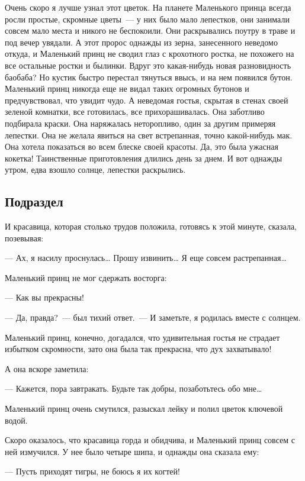 \documentclass[14pt, a4paper, titlepage]{extarticle}
\begin{document}
Очень скоро я лучше узнал этот цветок. На планете Маленького принца всегда росли простые, скромные цветы~--- у них было мало лепестков, они занимали совсем мало места и никого не беспокоили. Они раскрывались поутру в траве и под вечер увядали. А этот пророс однажды из зерна, занесенного неведомо откуда, и Маленький принц не сводил глаз с крохотного ростка, не похожего на все остальные ростки и былинки. Вдруг это какая-нибудь новая разновидность баобаба? Но кустик быстро перестал тянуться ввысь, и на нем появился бутон. Маленький принц никогда еще не видал таких огромных бутонов и предчувствовал, что увидит чудо. А неведомая гостья, скрытая в стенах своей зеленой комнатки, все готовилась, все прихорашивалась. Она заботливо подбирала краски. Она наряжалась неторопливо, один за другим примеряя лепестки. Она не желала явиться на свет встрепанная, точно какой-нибудь мак. Она хотела показаться во всем блеске своей красоты. Да, это была ужасная кокетка! Таинственные приготовления длились день за днем. И вот однажды утром, едва взошло солнце, лепестки раскрылись.\cite{bib:prince}

\subsection{Подраздел}

И красавица, которая столько трудов положила, готовясь к этой минуте, сказала, позевывая:

--- Ах, я насилу проснулась\dots{} Прошу извинить\dots{} Я еще совсем растрепанная\dots{}

Маленький принц не мог сдержать восторга:

--- Как вы прекрасны!

--- Да, правда?~--- был тихий ответ.~--- И заметьте, я родилась вместе с солнцем.

Маленький принц, конечно, догадался, что удивительная гостья не страдает избытком скромности, зато она была так прекрасна, что дух захватывало!

А она вскоре заметила:

--- Кажется, пора завтракать. Будьте так добры, позаботьтесь обо мне\dots{}

Маленький принц очень смутился, разыскал лейку и полил цветок ключевой водой.

Скоро оказалось, что красавица горда и обидчива, и Маленький принц совсем с ней измучился. У нее было четыре шипа, и однажды она сказала ему:

--- Пусть приходят тигры, не боюсь я их когтей!
\end{document}
